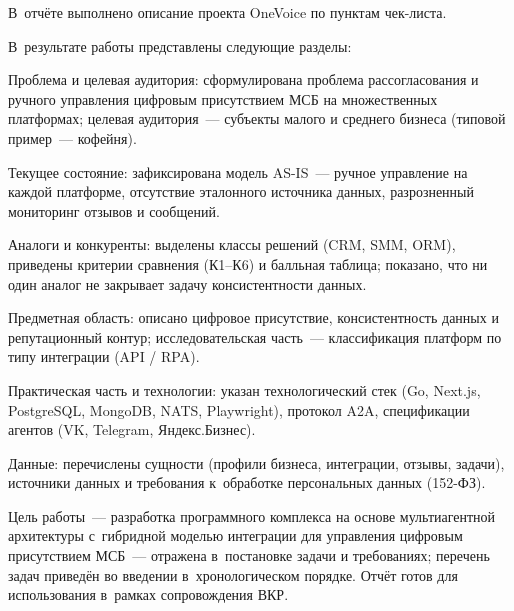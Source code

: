 \Conclusion

В~отчёте выполнено описание проекта OneVoice по пунктам чек-листа.

В~результате работы представлены следующие разделы:

\begin{compactlist}
  \item Проблема и целевая аудитория: сформулирована проблема рассогласования и ручного управления цифровым присутствием МСБ на множественных платформах; целевая аудитория~--- субъекты малого и среднего бизнеса (типовой пример~--- кофейня).
  \item Текущее состояние: зафиксирована модель AS-IS~--- ручное управление на каждой платформе, отсутствие эталонного источника данных, разрозненный мониторинг отзывов и сообщений.
  \item Аналоги и конкуренты: выделены классы решений (CRM, SMM, ORM), приведены критерии сравнения (К1--К6) и балльная таблица; показано, что ни один аналог не закрывает задачу консистентности данных.
  \item Предметная область: описано цифровое присутствие, консистентность данных и репутационный контур; исследовательская часть~--- классификация платформ по типу интеграции (API / RPA).
  \item Практическая часть и технологии: указан технологический стек (Go, Next.js, PostgreSQL, MongoDB, NATS, Playwright), протокол A2A, спецификации агентов (VK, Telegram, Яндекс.Бизнес).
  \item Данные: перечислены сущности (профили бизнеса, интеграции, отзывы, задачи), источники данных и требования к~обработке персональных данных (152-ФЗ).
\end{compactlist}

Цель работы~--- разработка программного комплекса на основе мультиагентной архитектуры с~гибридной моделью интеграции для управления цифровым присутствием МСБ~--- отражена в~постановке задачи и требованиях; перечень задач приведён во введении в~хронологическом порядке. Отчёт готов для использования в~рамках сопровождения ВКР.
